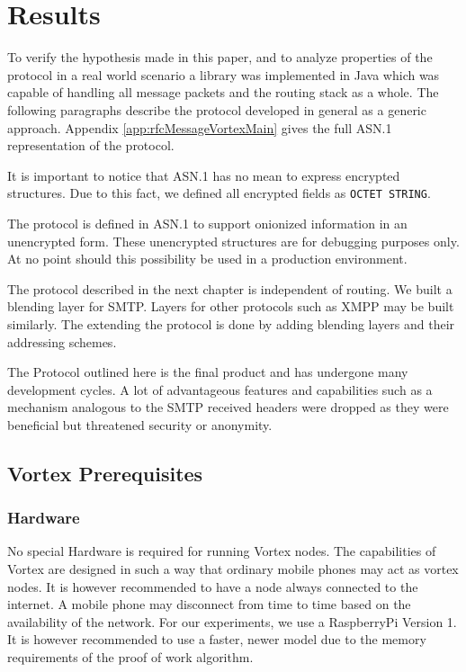 
\part{Results}
To verify the hypothesis made in this paper, and to analyze properties of the protocol in a real world scenario a library was implemented in Java which was capable of handling all message packets and the routing stack as a whole. The following paragraphs describe the protocol developed in general as a generic approach. Appendix \ref{app:rfcMessageVortexMain} gives the full ASN.1 representation of the protocol. 

It is important to notice that ASN.1 has no mean to express encrypted structures. Due to this fact, we defined all encrypted fields as \verb|OCTET STRING|. 

The protocol is defined in ASN.1 to support onionized information in an unencrypted form. These unencrypted structures are for debugging purposes only. At no point should this possibility be used in a production environment.

The protocol described in the next chapter is independent of routing. We built a blending layer for SMTP. Layers for other protocols such as XMPP may be built similarly. The extending the protocol is done by adding blending layers and their addressing schemes.

The Protocol outlined here is the final product and has undergone many development cycles. A lot of advantageous features and capabilities such as a mechanism analogous to the SMTP received headers were dropped as they were beneficial but threatened security or anonymity.

\chapter{Vortex Prerequisites}
\section{Hardware}
No special Hardware is required for running Vortex nodes. The capabilities of Vortex are designed in such a way that ordinary mobile phones may act as vortex nodes. It is however recommended to have a node always connected to the internet. A mobile phone may disconnect from time to time based on the availability of the network. For our experiments, we use a RaspberryPi Version 1. It is however recommended to use a faster, newer model due to the memory requirements of the proof of work algorithm.

